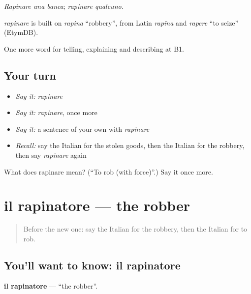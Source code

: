 \emph{Rapinare una banca}; \emph{rapinare qualcuno}.

\begin{cousinweb}
\emph{rapinare} is built on \emph{rapina} \textquotedblleft{}robbery\textquotedblright{}, from Latin \emph{rapīna} and \emph{rapere} \textquotedblleft{}to seize\textquotedblright{} (EtymDB).
\end{cousinweb}

\begin{grammarlens}[title={What you've built}]
One more word for telling, explaining and describing at B1.
\end{grammarlens}

\subsection*{Your turn}
\begin{itemize}
\raggedright
  \item \emph{Say it:} \emph{rapinare}
  \item \emph{Say it:} \emph{rapinare}, once more
  \item \emph{Say it:} a sentence of your own with \emph{rapinare}
  \item \emph{Recall:} say the Italian for the stolen goods, then the Italian for the robbery, then say \emph{rapinare} again
\end{itemize}

\begin{tcolorbox}[breakable,colback=teal!4,colframe=teal!35!black,title={Before you move on}]
What does rapinare mean? (\textquotedblleft{}To rob (with force)\textquotedblright{}.) Say it once more.
\end{tcolorbox}
\section[il rapinatore]{il rapinatore — the robber}

\label{lesson:IT-C292-rapinatore}



\begin{quote}
Before the new one: say the Italian for the robbery, then the Italian for to rob.
\end{quote}

\subsection*{You'll want to know: il rapinatore}
\textbf{il rapinatore} — \textquotedblleft{}the robber\textquotedblright{}.

